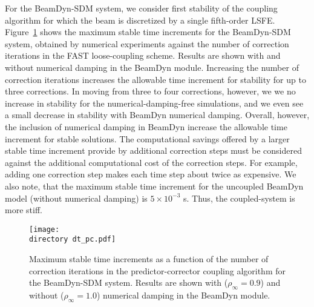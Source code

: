 \documentclass{aiaa-tc}
\def\directory{EPSF/}
\begin{document}
For the BeamDyn-SDM system, we consider first stability of the coupling algorithm for which the beam is discretized by a single fifth-order LSFE. 
Figure~\ref{fig:CoupledDTPC} shows the maximum stable time increments for the BeamDyn-SDM system, obtained by numerical experiments against the number of correction iterations in the FAST loose-coupling scheme.  Results are shown with and without numerical damping in the BeamDyn module.
Increasing the number of correction iterations increases the allowable time increment for stability for up to three corrections.  In moving from three to four corrections, however, we we no increase in stability for the numerical-damping-free simulations, and we even see a small decrease in stability with BeamDyn numerical damping.  Overall, however, the inclusion of numerical damping in BeamDyn increase the allowable time increment for stable solutions.
The computational savings offered by a larger stable time increment provide by additional correction steps must be considered against the additional computational cost of the correction steps.  
For example, adding one correction step makes each time step about twice as expensive.
We also note, that the maximum stable time increment for the uncoupled BeamDyn model (without numerical damping) is $5 \times 10^{-3}$ s.  Thus, the coupled-system is more stiff.

\begin{figure}[h!tp]
\centering
\texttt{[image: \\directory dt\_pc.pdf]}
\caption{Maximum stable time increments as a function of the number of correction iterations in the predictor-corrector coupling algorithm for the BeamDyn-SDM system. Results are shown with ($\rho_\infty = 0.9$) and without ($\rho_\infty = 1.0$) numerical damping in the BeamDyn module.
} 
\label{fig:CoupledDTPC}
\end{figure}
\end{document}
